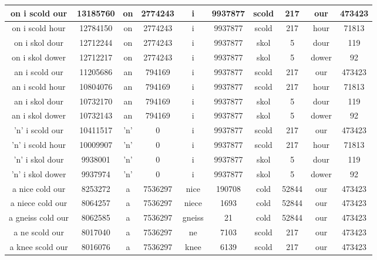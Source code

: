 \begin {longtable}{ cc|cccccccc }
 on i scold our   &  13185760  &   on   &  2774243  &   i   &  9937877  &   scold   &  217  &   our   &  473423   \\ \hline
 on i scold hour   &  12784150  &   on   &  2774243  &   i   &  9937877  &   scold   &  217  &   hour   &  71813   \\ \hline
 on i skol dour   &  12712244  &   on   &  2774243  &   i   &  9937877  &   skol   &  5  &   dour   &  119   \\ \hline
 on i skol dower   &  12712217  &   on   &  2774243  &   i   &  9937877  &   skol   &  5  &   dower   &  92   \\ \hline
 an i scold our   &  11205686  &   an   &  794169  &   i   &  9937877  &   scold   &  217  &   our   &  473423   \\ \hline
 an i scold hour   &  10804076  &   an   &  794169  &   i   &  9937877  &   scold   &  217  &   hour   &  71813   \\ \hline
 an i skol dour   &  10732170  &   an   &  794169  &   i   &  9937877  &   skol   &  5  &   dour   &  119   \\ \hline
 an i skol dower   &  10732143  &   an   &  794169  &   i   &  9937877  &   skol   &  5  &   dower   &  92   \\ \hline
 'n' i scold our   &  10411517  &   'n'   &  0  &   i   &  9937877  &   scold   &  217  &   our   &  473423   \\ \hline
 'n' i scold hour   &  10009907  &   'n'   &  0  &   i   &  9937877  &   scold   &  217  &   hour   &  71813   \\ \hline
 'n' i skol dour   &  9938001  &   'n'   &  0  &   i   &  9937877  &   skol   &  5  &   dour   &  119   \\ \hline
 'n' i skol dower   &  9937974  &   'n'   &  0  &   i   &  9937877  &   skol   &  5  &   dower   &  92   \\ \hline
 a nice cold our   &  8253272  &   a   &  7536297  &   nice   &  190708  &   cold   &  52844  &   our   &  473423   \\ \hline
 a niece cold our   &  8064257  &   a   &  7536297  &   niece   &  1693  &   cold   &  52844  &   our   &  473423   \\ \hline
 a gneiss cold our   &  8062585  &   a   &  7536297  &   gneiss   &  21  &   cold   &  52844  &   our   &  473423   \\ \hline
 a ne scold our   &  8017040  &   a   &  7536297  &   ne   &  7103  &   scold   &  217  &   our   &  473423   \\ \hline
 a knee scold our   &  8016076  &   a   &  7536297  &   knee   &  6139  &   scold   &  217  &   our   &  473423   \\ \hline

\end{longtable}
